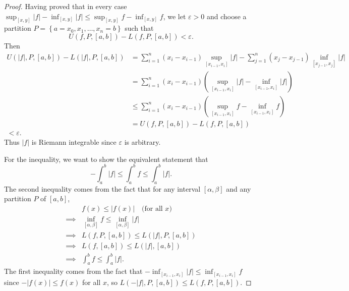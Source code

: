 \documentclass[12pt]{article}
\theoremstyle{definition}
\begin{document}
\begin{proof}
  Having proved that in every case $\sup_{[x,y]}|f| - \inf_{[x,y]}|f| \leq \sup_{[x,y]}f - \inf_{[x,y]}f$, we let $\varepsilon > 0$ and choose a partition $P = \left\lbrace a = x_0, x_1, \dots, x_n = b \right\rbrace$ such that \begin{equation*}
		U(f, P, [a, b]) - L(f,P,[a,b]) < \varepsilon.
	\end{equation*}
	Then \begin{align*}
		U(|f|, P, [a, b]) - L(|f|, P, [a,b]) & = \sum_{i=1}^n(x_i-x_{i-1}) \sup_{[x_{i-1},x_i]}|f| - \sum_{j=1}^n(x_j-x_{j-1})\inf_{[x_{j-1},x_j]}|f| \\
		                                     & = \sum_{i=1}^n(x_i - x_{i-1}) \left( \sup_{[x_{i-1},x_i]}|f| - \inf_{[x_{i-1},x_i]} |f| \right)        \\
		                                     & \leq \sum_{i=1}^n(x_i - x_{i-1}) \left( \sup_{[x_{i-1},x_i]}f - \inf_{[x_{i-1},x_i]} f \right)         \\
		                                     & = U(f, P, [a, b]) - L(f, P, [a,b])                                                                     \\
		< \varepsilon.
	\end{align*}
	Thus $|f|$ is Riemann integrable since $\varepsilon$ is arbitrary.

	For the inequality, we want to show the equivalent statement that \begin{equation*}
		-\int_a^b |f| \leq \int_a^b f \leq \int_a^b |f|.
	\end{equation*}
	The second inequality comes from the fact that for any interval $[\alpha, \beta]$ and any partition $P$ of $[a,b]$, \begin{align*}
		         & f(x) \leq |f(x)| \quad \text{(for all $x$)}              \\
		\implies & \inf_{[\alpha, \beta]} f \leq \inf_{[\alpha, \beta]} |f| \\
		\implies & L(f, P, [a, b]) \leq L(|f|, P, [a,b])                    \\
		\implies & L(f, [a,b]) \leq L(|f|, [a,b])                           \\
		\implies & \int_a^b f \leq \int_a^b |f|.
	\end{align*}
	The first inequality comes from the fact that $-\inf_{[x_{i-1}, x_i]} |f| \leq \inf_{[x_{i-1},x_i]} f$ since $-|f(x)| \leq f(x)$ for all $x$, so $L(-|f|, P, [a, b]) \leq L(f, P, [a, b])$.
\end{proof}
\end{document}
